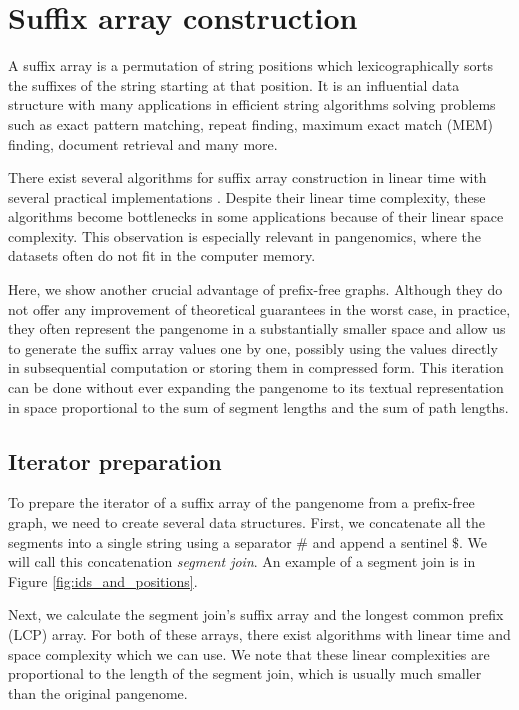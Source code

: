 \section{Suffix array construction}
A suffix array is a permutation of string positions which lexicographically
sorts the suffixes of the string starting at that position.
It is an influential data structure with many applications in efficient string algorithms solving problems such as exact pattern matching, repeat finding, maximum exact match (MEM) finding, document retrieval and many more.

There exist several algorithms for suffix array construction in linear time \cite{skew2003karkkainen,sais2009nong,saoverview2007puglisi} with several practical implementations \cite{louza2017inducing,libdivsufsort}.
Despite their linear time complexity, these algorithms become bottlenecks in some applications because of their linear space complexity.
This observation is especially relevant in pangenomics, where the datasets often do not fit in the computer memory.

Here, we show another crucial advantage of prefix-free graphs.
Although they do not offer any improvement of theoretical guarantees in the worst case, in practice, they often represent the pangenome in a substantially smaller space and allow us to generate the suffix array values one by one, possibly using the values directly in subsequential computation or storing them in compressed form.
This iteration can be done without ever expanding the pangenome to its textual representation in space proportional to the sum of segment lengths and the sum of path lengths.

\subsection{Iterator preparation}
To prepare the iterator of a suffix array of the pangenome from a prefix-free graph, we need to create several data structures.
First, we concatenate all the segments into a single string using a separator $\texttt{\#}$ and append a sentinel $\texttt{\$}$.
We will call this concatenation \emph{segment join}.
An example of a segment join is in Figure \ref{fig:ids_and_positions}.

Next, we calculate the segment join's suffix array and the longest common prefix (LCP) array.
For both of these arrays, there exist algorithms with linear time and space complexity which we can use.
We note that these linear complexities are proportional to the length of the segment join, which is usually much smaller than the original pangenome.

